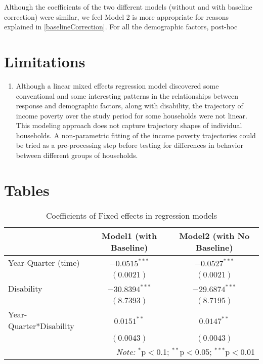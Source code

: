 \documentclass[11pt]{extarticle} %
\begin{document}
Although the coefficients of the two different models (without and with baseline correction) were similar, we feel Model 2 is more appropriate for reasons explained in \ref{baselineCorrection}. For all the demographic factors, post-hoc 

\section{Limitations}
\begin{enumerate}
\item Although a linear mixed effects regression model discovered some conventional and some interesting patterns in the relationships between response and demographic factors, along with disability, the trajectory of income poverty over the study period for some households were not linear. This modeling approach does not capture trajectory shapes of individual households. A non-parametric fitting of the income poverty trajectories could be tried as a pre-processing step before testing for differences in behavior between different groups of households. 
\end{enumerate}

\newpage
\section{Tables}

\noindent
\begin{table}[H] 
\centering 
\footnotesize
\begin{tabular}{l|c|c}
\hline 
\hline 
& Model1 (with Baseline) & Model2 (with No Baseline) \\
\hline 
Year-Quarter (time)	&	$-0.0515^{***}$		&	$-0.0527^{***}$ 	\\
			&	$(0.0021)$		&	$(0.0021)$		\\
Disability		&	$-30.8394^{***}$	&	$-29.6874^{***}$	\\    
			&	$(8.7393)$		&	$(8.7195)$		\\
Year-Quarter*Disability	&	$0.0151^{**}$		&	$0.0147^{**}$		\\
			&	$(0.0043)$		&	$(0.0043)$		\\
\hline 
\hline 
\multicolumn{3}{r}{\textit{Note:}  $^{*}$p$<$0.1; $^{**}$p$<$0.05; $^{***}$p$<$0.01} \\ 

\end{tabular}
\caption{Coefficients of Fixed effects in regression models} 
\label{tab:FixedEffectsBetas} 
\end{table}
\end{document}
